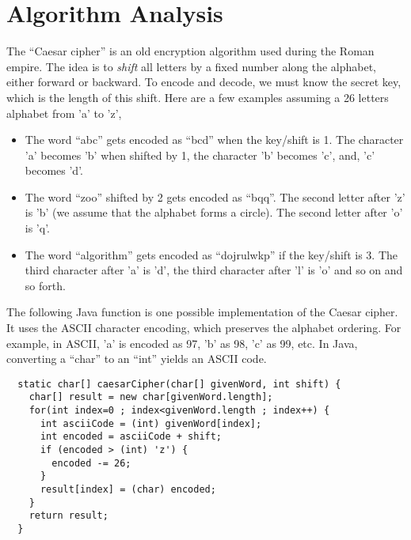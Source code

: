 \documentclass{article}
\begin{document}
\section{Algorithm Analysis}

The ``Caesar cipher'' is an old encryption algorithm used during the
Roman empire. The idea is to \emph{shift} all letters by a fixed
number along the alphabet, either forward or backward. To encode and
decode, we must know the secret key, which is the length of this
shift. Here are a few examples assuming a 26 letters alphabet from 'a'
to 'z',


\begin{itemize}
\item The word ``abc'' gets encoded as ``bcd'' when the key/shift is
  1. The character 'a' becomes 'b' when shifted by 1, the character
  'b' becomes 'c', and, 'c' becomes 'd'.
\item The word ``zoo'' shifted by 2 gets encoded as ``bqq''. The
  second letter after 'z' is 'b' (we assume that the alphabet forms a
  circle). The second letter after 'o' is 'q'.
\item The word ``algorithm'' gets encoded as ``dojrulwkp'' if the
  key/shift is 3. The third character after 'a' is 'd', the third
  character after 'l' is 'o' and so on and so forth.
\end{itemize}


The following Java function is one possible implementation of the
Caesar cipher. It uses the ASCII character encoding, which preserves
the alphabet ordering. For example, in ASCII, 'a' is encoded as 97,
'b' as 98, 'c' as 99, etc. In Java, converting a ``char'' to an
``int'' yields an ASCII code.

\begin{verbatim}
  static char[] caesarCipher(char[] givenWord, int shift) {
    char[] result = new char[givenWord.length];
    for(int index=0 ; index<givenWord.length ; index++) {
      int asciiCode = (int) givenWord[index];
      int encoded = asciiCode + shift;
      if (encoded > (int) 'z') {
        encoded -= 26;
      }
      result[index] = (char) encoded;
    }
    return result;
  }
\end{verbatim}
\end{document}
